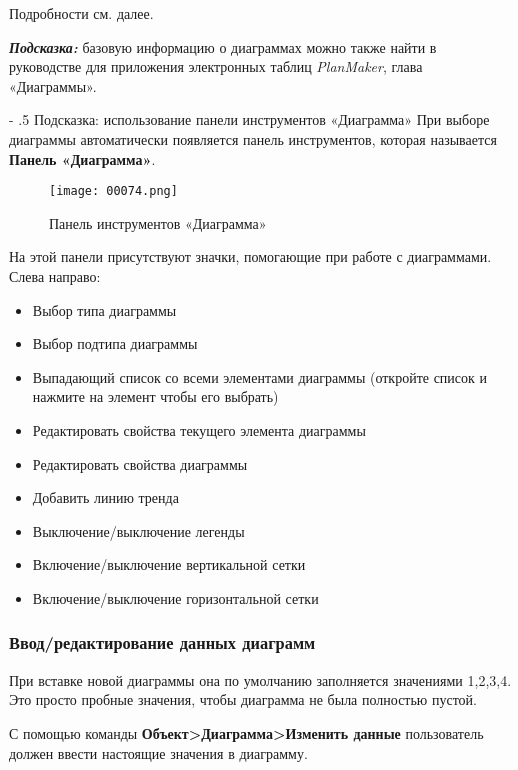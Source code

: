 \documentclass[a4paper,10pt]{article}
\makeatletter
\renewcommand\paragraph{%
   \@startsection{paragraph}{4}{0mm}%
      {-\baselineskip}%
      {.5\baselineskip}%
      {\normalfont\normalsize\bfseries}}
\makeatother
\begin{document}
Подробности см. далее.

\begin{mdframed}[backgroundcolor=blue!10]
\textbf{\textit{Подсказка:}} базовую информацию о диаграммах можно также найти в руководстве для приложения электронных таблиц \textit{PlanMaker}, глава «Диаграммы». 
\end{mdframed}

\paragraph{Подсказка: использование панели инструментов «Диаграмма»}
При выборе диаграммы автоматически появляется панель инструментов, которая называется \textbf{Панель «Диаграмма»}.

\begin{figure}[ht]
\texttt{[image: 00074.png]}
\centering
\caption{Панель инструментов «Диаграмма»}
\end{figure}

На этой панели присутствуют значки, помогающие при работе с диаграммами. Слева направо:

\begin{itemize}
 \item Выбор типа диаграммы
 \item Выбор подтипа диаграммы
 \item Выпадающий список со всеми элементами диаграммы (откройте список и нажмите на элемент чтобы его выбрать)
 \item Редактировать свойства текущего элемента диаграммы
 \item Редактировать свойства диаграммы
 \item Добавить линию тренда
 \item Выключение/выключение легенды
 \item Включение/выключение вертикальной сетки
 \item Включение/выключение горизонтальной сетки
\end{itemize}

\subsubsection{Ввод/редактирование данных диаграмм}
При вставке новой диаграммы она по умолчанию заполняется значениями 1,2,3,4. Это просто пробные значения, чтобы диаграмма не была полностью пустой.

С помощью команды \textbf{Объект>Диаграмма>Изменить данные} пользователь должен ввести настоящие значения в диаграмму.
\end{document}
